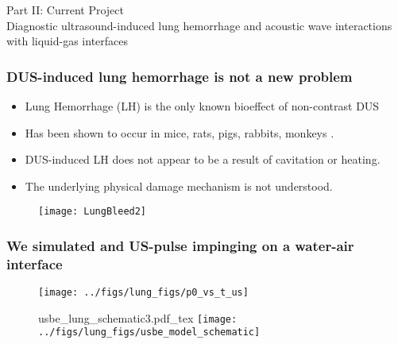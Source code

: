 \begin{frame}
  \centering
  \begin{center}
    {\LARGE Part II: Current Project}\\
    
    Diagnostic ultrasound-induced lung hemorrhage and acoustic wave
    interactions with liquid-gas interfaces
  \end{center}
\end{frame}
\begin{frame} \frametitle{\vspace*{0.5cm}DUS-induced lung hemorrhage is not a new problem}
  {\small%
    \begin{itemize}%
    \item Lung Hemorrhage (LH) is the only known bioeffect of non-contrast DUS%
    \item Has been shown to occur in mice, rats, pigs, rabbits, monkeys \citep{Child1990,OBrien1997a,Tarantal1994a}.%
    \item DUS-induced LH does not appear to be a result of cavitation or heating.%
    \item The underlying physical damage mechanism is not understood.%
    \end{itemize}%
    \begin{figure}%
      \centering%
      \texttt{[image: LungBleed2]} \nocite{Miller2012}%
    \end{figure}%
  }
\end{frame}
\begin{frame}\frametitle{\vspace*{0.5cm}We simulated and US-pulse impinging on a water-air interface}
  \begin{minipage}{0.62\textwidth}
    \begin{minipage}{\textwidth}
      \begin{figure}
        \centering
        \texttt{[image: ../figs/lung\_figs/p0\_vs\_t\_us]}%
      \end{figure}
    \end{minipage}
    \begin{minipage}{\textwidth}
      \begin{figure}
        \centering {} {\footnotesize
          {usbe_lung_schematic3.pdf_tex}
          \hfill%
        }
        \texttt{[image: ../figs/lung\_figs/usbe\_model\_schematic]}
      \end{figure}
    \end{minipage}
  \end{minipage}
  \hfill
  \begin{minipage}{0.36\textwidth}
  \end{minipage}
\end{frame}
